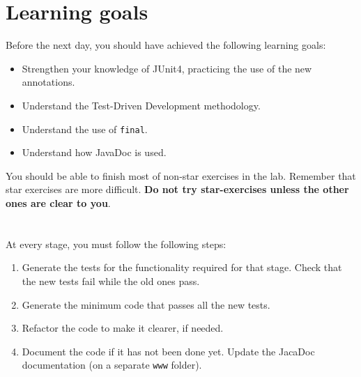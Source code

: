 \documentclass{article}
\begin{document}
\section*{Learning goals}
\label{sec:learning-goals}

Before the next day, you should have achieved the following learning
goals: 

\begin{itemize}
\item Strengthen your knowledge of JUnit4, practicing the use of the
  new annotations.
\item Understand the Test-Driven Development methodology. 
\item Understand the use of \verb+final+.
\item Understand how JavaDoc is used.
\end{itemize}

You should be able to finish most of non-star exercises in the lab. 
Remember that star exercises are more difficult. 
\textbf{Do not try star-exercises unless the other ones are clear to
  you}.  

\section{}
\label{sec:jj}

At every stage, you must follow the following steps: 

\begin{enumerate}
\item Generate the tests for the functionality required for that
  stage. Check that the new tests fail while the old ones pass.
\item Generate the minimum code that passes all the new tests.
\item Refactor the code to make it clearer, if needed.
\item Document the
  code if it has not been done yet. Update the JacaDoc documentation
  (on a separate \verb+www+ folder). 
\end{enumerate}
\end{document}
